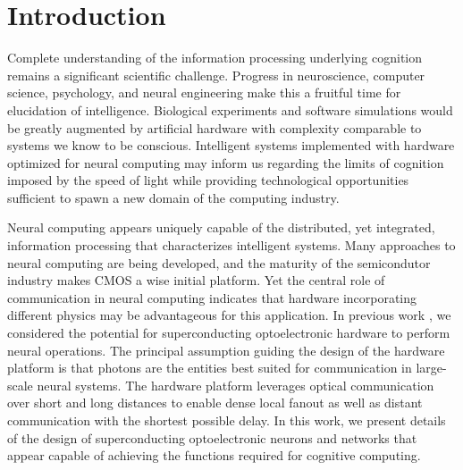 \documentclass[twocolumn]{article}
\begin{document}

\section{\label{sec:introduction}Introduction}
Complete understanding of the information processing underlying cognition remains a significant scientific challenge. Progress in neuroscience, computer science, psychology, and neural engineering make this a fruitful time for elucidation of intelligence. Biological experiments and software simulations would be greatly augmented by artificial hardware with complexity comparable to systems we know to be conscious. Intelligent systems implemented with hardware optimized for neural computing may inform us regarding the limits of cognition imposed by the speed of light while providing technological opportunities sufficient to spawn a new domain of the computing industry.

Neural computing appears uniquely capable of the distributed, yet integrated, information processing that characterizes intelligent systems. Many approaches to neural computing are being developed, and the maturity of the semicondutor industry makes CMOS a wise initial platform. Yet the central role of communication in neural computing indicates that hardware incorporating different physics may be advantageous for this application. In previous work \cite{shbu2017}, we considered the potential for superconducting optoelectronic hardware to perform neural operations. The principal assumption guiding the design of the hardware platform is that photons are the entities best suited for communication in large-scale neural systems. The hardware platform leverages optical communication over short and long distances to enable dense local fanout as well as distant communication with the shortest possible delay. In this work, we present details of the design of superconducting optoelectronic neurons and networks that appear capable of achieving the functions required for cognitive computing. 
\end{document}
